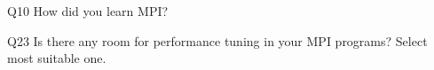 \begin{description}%
\item{Q10} How did you learn MPI?%
\item{Q23} Is there any room for performance tuning in your MPI programs? Select most suitable one.%
\end{description}%
